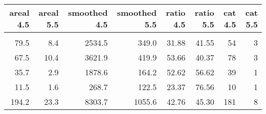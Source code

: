 \begin{tabular}{rrrrrrrr}
\toprule
 areal 4.5 &  areal 5.5 &  smoothed 4.5 &  smoothed 5.5 &  ratio 4.5 &  ratio 5.5 &  cat 4.5 &  cat 5.5 \\
\midrule
           &            &               &               &            &            &          &          \\
      79.5 &        8.4 &        2534.5 &         349.0 &      31.88 &      41.55 &       54 &        3 \\
      67.5 &       10.4 &        3621.9 &         419.9 &      53.66 &      40.37 &       78 &        3 \\
      35.7 &        2.9 &        1878.6 &         164.2 &      52.62 &      56.62 &       39 &        1 \\
      11.5 &        1.6 &         268.7 &         122.5 &      23.37 &      76.56 &       10 &        1 \\
     194.2 &       23.3 &        8303.7 &        1055.6 &      42.76 &      45.30 &      181 &        8 \\
\bottomrule
\end{tabular}
